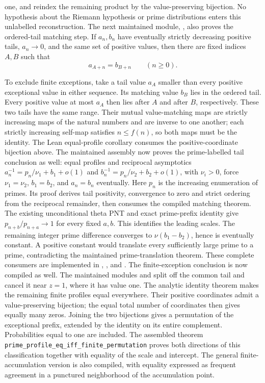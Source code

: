\documentclass[11pt]{article}
\theoremstyle{definition}
\begin{document}
one, and reindex the remaining product by the value-preserving bijection.
No hypothesis about the Riemann hypothesis or prime distributions enters
this unlabelled reconstruction.
The next maintained module,
,
also proves the ordered-tail matching step. If $a_n,b_n$ have eventually
strictly decreasing positive tails, $a_n\to0$, and the same set of positive
values, then there are fixed indices $A,B$ such that
\[
 a_{A+n}=b_{B+n}\qquad(n\ge0).
\]
\begin{sloppypar}
To exclude finite exceptions, take a tail value $a_A$ smaller than every
positive exceptional value in either sequence. Its matching value $b_B$
lies in the ordered tail. Every positive value at most $a_A$ then lies
after $A$ and after $B$, respectively. These two tails have the same range.
Their mutual value-matching maps are strictly increasing maps of the natural
numbers and are inverse to one another; each strictly increasing self-map satisfies
$n\le f(n)$, so both maps must be the identity. The Lean equal-profile
corollary consumes the positive-coordinate bijection above.
The maintained assembly  now proves
the prime-labelled tail conclusion as well: equal profiles and reciprocal
asymptotics $a_n^{-1}=p_n/\nu_1+b_1+o(1)$ and
$b_n^{-1}=p_n/\nu_2+b_2+o(1)$, with $\nu_i>0$, force
$\nu_1=\nu_2$, $b_1=b_2$, and $a_n=b_n$ eventually. Here $p_n$ is the
increasing enumeration of primes. Its proof derives tail positivity,
convergence to zero and strict ordering from the reciprocal remainder,
then consumes the compiled matching theorem. The existing unconditional
theta PNT and exact prime-prefix identity give $p_{n+b}/p_{n+a}\to1$
for every fixed $a,b$. This identifies the leading scales. The remaining
integer prime difference converges to $\nu(b_1-b_2)$, hence is eventually
constant. A positive constant would translate every sufficiently large
prime to a prime, contradicting the maintained prime-translation theorem.
These complete consumers are implemented in
,
, and
.
The finite-exception conclusion is now compiled as well.
The maintained modules
and
split off the common tail and cancel it near $z=1$, where it has value one.
The analytic identity theorem makes the remaining finite profiles equal
everywhere. Their positive coordinates admit a value-preserving bijection;
the equal total number of coordinates then gives equally many zeros.
Joining the two bijections gives a permutation of the exceptional prefix,
extended by the identity on its entire complement. Probabilities equal to
one are included. The assembled theorem
\texttt{prime\_profile\_eq\_iff\_finite\_permutation} proves both directions
of this classification together with equality of the scale and intercept.
The general finite-accumulation version is also compiled, with equality
expressed as frequent agreement in a punctured neighborhood of the
accumulation point.
\end{sloppypar}
\end{document}
